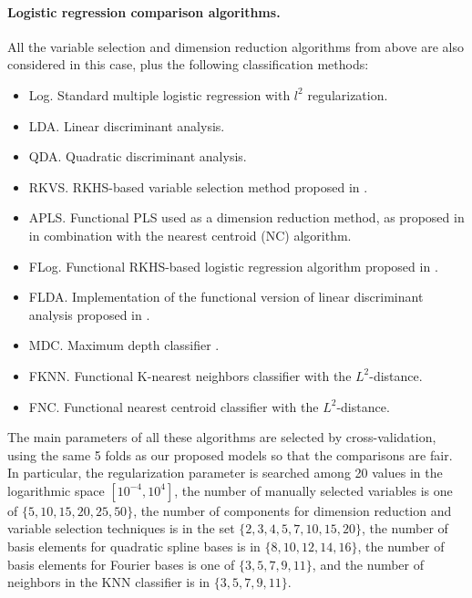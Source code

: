\paragraph{Logistic regression comparison algorithms.} All the variable selection and dimension reduction algorithms from above are also considered in this case, plus the following classification methods:
\begin{itemize}
  \item Log.\hspace{.3em} Standard multiple logistic regression with \(l^2\) regularization.
  \item LDA.\hspace{.3em} Linear discriminant analysis.
  \item QDA.\hspace{.3em} Quadratic discriminant analysis.
  \item RKVS.\hspace{.3em} RKHS-based variable selection method proposed in \citet{berrendero2018use}.
  \item APLS.\hspace{.3em} Functional PLS used as a dimension reduction method, as proposed in \citet{delaigle2012achieving} in combination with the nearest centroid (NC) algorithm.
  \item FLog.\hspace{.3em} Functional RKHS-based logistic regression algorithm proposed in \citet{berrendero2018functional}.
  \item FLDA.\hspace{.3em} Implementation of the functional version of linear discriminant analysis proposed in \citet{preda2007pls}.
  \item MDC.\hspace{.3em} Maximum depth classifier \citep[e.g.][]{ghosh2005maximum}.
  \item FKNN.\hspace{.3em} Functional K-nearest neighbors classifier with the \(L^2\)-distance.
  \item FNC.\hspace{.3em} Functional nearest centroid classifier with the \(L^2\)-distance.
\end{itemize}

The main parameters of all these algorithms are selected by cross-validation, using the same 5 folds as our proposed models so that the comparisons are fair. In particular, the regularization parameter is searched among 20 values in the logarithmic space \([10^{-4}, 10^4]\), the number of manually selected variables is one of \(\{5, 10, 15, 20, 25, 50\}\), the number of components for dimension reduction and variable selection techniques is in the set \(\{2, 3, 4, 5, 7, 10, 15, 20\}\), the number of basis elements for quadratic spline bases is in \(\{8,10,12,14,16\}\), the number of basis elements for Fourier bases is one of \(\{3,5,7,9,11\}\), and the number of neighbors in the KNN classifier is in \(\{3,5,7,9,11\}\).

